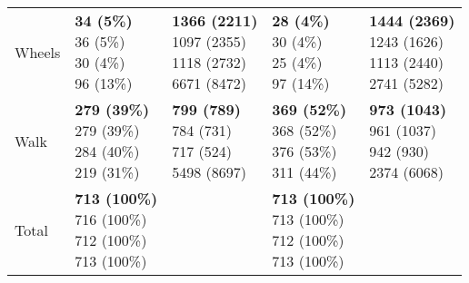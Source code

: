 \begin{table}
\begin{center}
\begin{small}
\begin{tabular}{lllll}
Wheels      &  \makecell[l]{\textbf{34 (5\%)} \\36 (5\%) \\30 (4\%) \\96 (13\%) \\}      &  \makecell[l]{\textbf{1366 (2211)} \\1097 (2355) \\1118 (2732) \\6671 (8472) \\}      &  \makecell[l]{\textbf{28 (4\%)} \\30 (4\%) \\25 (4\%) \\97 (14\%) \\}      &  \makecell[l]{\textbf{1444 (2369)} \\1243 (1626) \\1113 (2440) \\2741 (5282) \\} \\ \cline{2-5}
Walk      &  \makecell[l]{\textbf{279 (39\%)} \\279 (39\%) \\284 (40\%) \\219 (31\%) \\}      &  \makecell[l]{\textbf{799 (789)} \\784 (731) \\717 (524) \\5498 (8697) \\}      &  \makecell[l]{\textbf{369 (52\%)} \\368 (52\%) \\376 (53\%) \\311 (44\%) \\}      &  \makecell[l]{\textbf{973 (1043)} \\961 (1037) \\942 (930) \\2374 (6068) \\} \\ \cline{2-5}
      Total       & \makecell[l]{\textbf{713 (100\%)} \\716 (100\%) \\712 (100\%) \\713 (100\%) \\} &       & \makecell[l]{\textbf{713 (100\%)} \\713 (100\%) \\712 (100\%) \\713 (100\%) \\} & \\ 


\end{tabular}
\end{small}
\end{center}
\end{table}
